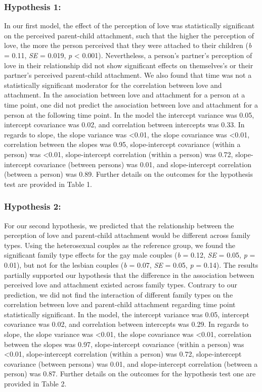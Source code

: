 \documentclass[man]{apa6}
\begin{document}
\hypertarget{hypothesis-1}{%
\subsubsection{Hypothesis 1:}\label{hypothesis-1}}

In our first model, the effect of the perception of love was statistically significant on the perceived parent-child attachment, such that the higher the perception of love, the more the person perceived that they were attached to their children (\emph{b} = 0.11, \emph{SE} = 0.019, \emph{p} \textless{} 0.001). Nevertheless, a person's partner's perception of love in their relationship did not show significant effects on themselves's or their partner's perceived parent-child attachment. We also found that time was not a statistically significant moderator for the correlation between love and attachment. In the association between love and attachment for a person at a time point, one did not predict the association between love and attachment for a person at the following time point. In the model the intercept variance was 0.05, intercept covariance was 0.02, and correlation between intercepts was 0.33. In regards to slope, the slope variance was \textless{}0.01, the slope covariance was \textless{}0.01, correlation between the slopes was 0.95, slope-intercept covariance (within a person) was \textless{}0.01, slope-intercept correlation (within a person) was 0.72, slope-intercept covariance (between persons) was 0.01, and slope-intercept correlation (between a person) was 0.89. Further details on the outcomes for the hypothesis test are provided in Table 1.

\hypertarget{hypothesis-2}{%
\subsubsection{Hypothesis 2:}\label{hypothesis-2}}

For our second hypothesis, we predicted that the relationship between the perception of love and parent-child attachment would be different across family types. Using the heterosexual couples as the reference group, we found the significant family type effects for the gay male couples (\emph{b} = 0.12, \emph{SE} = 0.05, \emph{p} = 0.01), but not for the lesbian couples (\emph{b} = 0.07, \emph{SE} = 0.05, \emph{p} = 0.14). The results partially supported our hypothesis that the difference in the association between perceived love and attachment existed across family types. Contrary to our prediction, we did not find the interaction of different family types on the correlation between love and parent-child attachment regarding time point statistically significant. In the model, the intercept variance was 0.05, intercept covariance was 0.02, and correlation between intercepts was 0.29. In regards to slope, the slope variance was \textless{}0.01, the slope covariance was \textless{}0.01, correlation between the slopes was 0.97, slope-intercept covariance (within a person) was \textless{}0.01, slope-intercept correlation (within a person) was 0.72, slope-intercept covariance (between persons) was 0.01, and slope-intercept correlation (between a person) was 0.87. Further details on the outcomes for the hypothesis test one are provided in Table 2.
\end{document}
